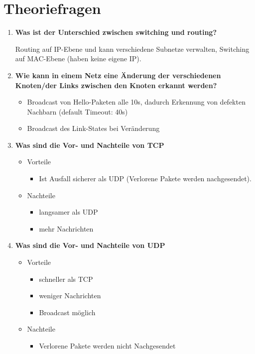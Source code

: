 \documentclass{article}
\begin{document}
\newpage
\section{Theoriefragen}
\begin{enumerate}
	\item \textbf{Was ist der Unterschied zwischen switching und routing?}
	\begin{flushleft}
		Routing auf IP-Ebene und kann verschiedene Subnetze verwalten, Switching auf MAC-Ebene (haben keine eigene IP).
	\end{flushleft}
	\item \textbf{Wie kann in einem Netz eine Änderung der verschiedenen Knoten/der Links zwischen den Knoten erkannt werden?}
	\begin{itemize}
		\item Broadcast von Hello-Paketen alle 10s, dadurch Erkennung von defekten Nachbarn (default Timeout: 40s)
		\item Broadcast des Link-States bei Veränderung
	\end{itemize}
	\item \textbf{Was sind die Vor- und Nachteile von TCP}
	\begin{itemize}
		\item Vorteile
			\begin{itemize}
				\item Ist Ausfall sicherer als UDP (Verlorene Pakete werden nachgesendet).
			\end{itemize}
		\item Nachteile
			\begin{itemize}
				\item langsamer als UDP 
				\item mehr Nachrichten
			\end{itemize}
	\end{itemize}
	\item \textbf{Was sind die Vor- und Nachteile von UDP}
	\begin{itemize}
		\item Vorteile
		\begin{itemize}
			\item schneller als TCP
			\item weniger Nachrichten
			\item Broadcast möglich
		\end{itemize}
		\item Nachteile
		\begin{itemize}
			\item Verlorene Pakete werden nicht Nachgesendet

\end{itemize}
\end{itemize}
\end{enumerate}
\end{document}
